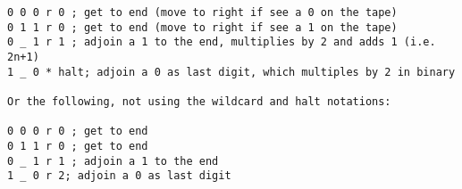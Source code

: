 \begin{verbatim}
0 0 0 r 0 ; get to end (move to right if see a 0 on the tape)
0 1 1 r 0 ; get to end (move to right if see a 1 on the tape)
0 _ 1 r 1 ; adjoin a 1 to the end, multiplies by 2 and adds 1 (i.e. 2n+1)
1 _ 0 * halt; adjoin a 0 as last digit, which multiples by 2 in binary 

Or the following, not using the wildcard and halt notations:

0 0 0 r 0 ; get to end
0 1 1 r 0 ; get to end
0 _ 1 r 1 ; adjoin a 1 to the end
1 _ 0 r 2; adjoin a 0 as last digit
\end{verbatim}
